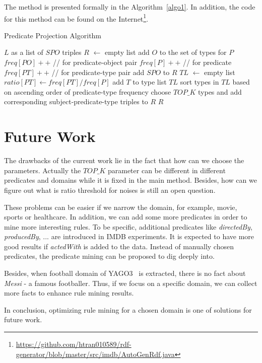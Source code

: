 \documentclass{acm_proc_article-sp}
\begin{document}
The method is presented formally in the Algorithm~\ref{algo1}. In addition, the code for this method can be found on the Internet\footnote{\url{https://github.com/htran010589/rdf-generator/blob/master/src/imdb/AutoGenRdf.java}}.

\begin{algorithm}[ht]
\caption{Predicate Projection Algorithm}
\label{algo1}
\begin{algorithmic}
\REQUIRE $L$ as a list of $SPO$ triples
\STATE $R$ $\leftarrow$ empty list
\STATE add $O$ to the set of types for $P$
\ENDIF
\STATE $freq[PO]++$  //  for predicate-object pair
\STATE $freq[P]++$  //  for predicate
\ENDFOR
\STATE
{}
\STATE $freq[PT]++$  //  for predicate-type pair
\ENDFOR
\ENDFOR
\STATE
{}
\STATE add $SPO$ to $R$
\ENDIF
\STATE
\STATE $TL$ $\leftarrow$ empty list
\STATE $ratio[PT] \leftarrow freq[PT] / freq[P]$
\STATE add $T$ to type list $TL$
\ENDIF
\ENDFOR
\STATE sort types in $TL$ based on ascending order of predicate-type frequency
\STATE choose $TOP\_K$ types and add corresponding subject-predicate-type triples to $R$
\ENDFOR
\STATE
\RETURN $R$
\end{algorithmic}
\end{algorithm}

\section{Future Work}

The drawbacks of the current work lie in the fact that how can we choose the parameters. Actually the $TOP\_K$ parameter can be different in different predicates and domains while it is fixed in the main method. Besides, how can we figure out what is ratio threshold for noises is still an open question.

These problems can be easier if we narrow the domain, for example, movie, sports or healthcare. In addition, we can add some more predicates in order to mine more interesting rules. To be specific, additional predicates like \textit{directedBy}, \textit{producedBy}, ... are introduced in IMDB experiments. It is expected to have more good results if \textit{actedWith} is added to the data. Instead of manually chosen predicates, the predicate mining can be proposed to dig deeply into.

Besides, when football domain of YAGO3~\cite{ref1} is extracted, there is no fact about \textit{Messi} - a famous footballer. Thus, if we focus on a specific domain, we can collect more facts to enhance rule mining results.

In conclusion, optimizing rule mining for a chosen domain is one of solutions for future work.



\end{document}
